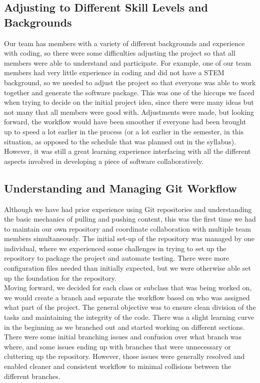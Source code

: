 \documentclass[10pt,letterpaper]{article}
\begin{document}
\subsection*{Adjusting to Different Skill Levels and Backgrounds}
Our team has members with a variety of different backgrounds and experience with coding, so there were some difficulties adjusting the project so that all members were able to understand and participate. For example, one of our team members had very little experience in coding and did not have a STEM background, so we needed to adjust the project so that everyone was able to work together and generate the software package. This was one of the hiccups we faced when trying to decide on the initial project idea, since there were many ideas but not many that all members were good with. Adjustments were made, but looking forward, the workflow would have been smoother if everyone had been brought up to speed a lot earlier in the process (or a lot earlier in the semester, in this situation, as opposed to the schedule that was planned out in the syllabus). However, it was still a great learning experience interfacing with all the different aspects involved in developing a piece of software collaboratively. 

\subsection*{Understanding and Managing Git Workflow}
Although we have had prior experience using Git repositories and understanding the basic mechanics of pulling and pushing content, this was the first time we had to maintain our own repository and coordinate collaboration with multiple team members simultaneously. The initial set-up of the repository was managed by one individual, where we experienced some challenges in trying to set up the repository to package the project and automate testing. There were more configuration files needed than initially expected, but we were otherwise able set up the foundation for the repository.\\

\noindent Moving forward, we decided for each class or subclass that was being worked on, we would create a branch and separate the workflow based on who was assigned what part of the project. The general objective was to ensure clean division of the tasks and maintaining the integrity of the code. There was a slight learning curve in the beginning as we branched out and started working on different sections. There were some initial branching issues and confusion over what branch was where, and some issues ending up with branches that were unnecessary or cluttering up the repository. However, those issues were generally resolved and enabled cleaner and consistent workflow to minimal collisions between the different branches. 
\end{document}
